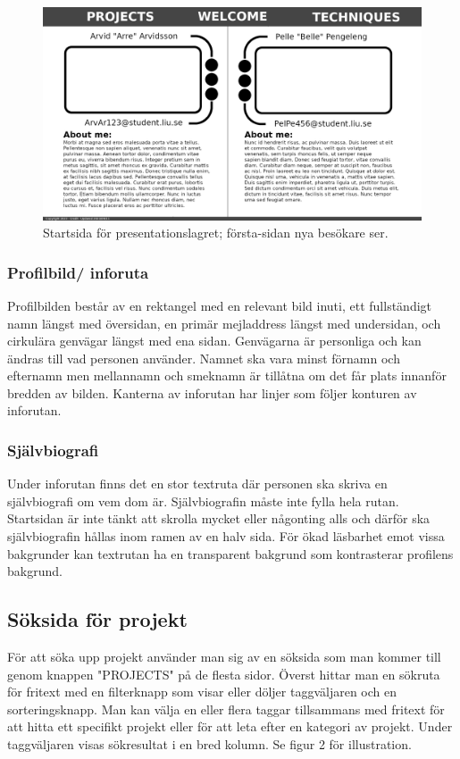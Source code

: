 \documentclass{liu_mall}
\begin{document}
\begin{figure}[h!]
    \centering
    \includegraphics{LOFI Homepage}
    \caption{Startsida för presentationslagret; första-sidan nya besökare ser.}
    \label{fig:Low-Fidelity-Prototyp Homepage}
\end{figure}

    \subsubsection{Profilbild/ inforuta}
        Profilbilden består av en rektangel med en relevant bild inuti, ett fullständigt namn längst med översidan, en primär mejladdress längst med undersidan, och cirkulära genvägar längst med ena sidan. Genvägarna är personliga och kan ändras till vad personen använder. Namnet ska vara minst förnamn och efternamn men mellannamn och smeknamn är tillåtna om det får plats innanför bredden av bilden. Kanterna av inforutan har linjer som följer konturen av inforutan.

    \subsubsection{Självbiografi}
        Under inforutan finns det en stor textruta där personen ska skriva en självbiografi om vem dom är. Självbiografin måste inte fylla hela rutan. Startsidan är inte tänkt att skrolla mycket eller någonting alls och därför ska självbiografin hållas inom ramen av en halv sida. För ökad läsbarhet emot vissa bakgrunder kan textrutan ha en transparent bakgrund som kontrasterar profilens bakgrund.

\newpage
\subsection{Söksida för projekt}
    För att söka upp projekt använder man sig av en söksida som man kommer till genom knappen "PROJECTS" på de flesta sidor. Överst hittar man en sökruta för fritext med en filterknapp som visar eller döljer taggväljaren och en sorteringsknapp. Man kan välja en eller flera taggar tillsammans med fritext för att hitta ett specifikt projekt eller för att leta efter en kategori av projekt. Under taggväljaren visas sökresultat i en bred kolumn. Se figur 2 för illustration.
\end{document}

